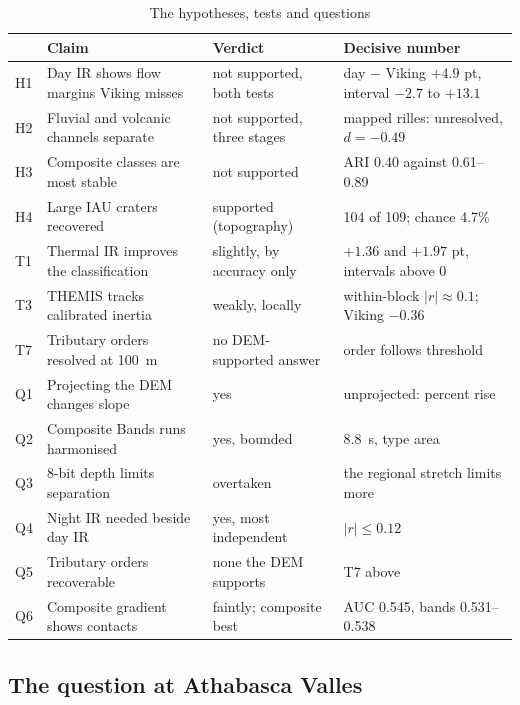 \documentclass[twocolumn]{aastex701}
\begin{document}
\begin{table}[t]
\centering
\caption{The hypotheses, tests and questions \label{tab:hyp}}
\small
\setlength{\tabcolsep}{3.5pt}
\begin{tabular}{llll}
\hline\hline
 & Claim & Verdict & Decisive number \\
\hline
H1 & Day IR shows flow margins Viking misses & not supported, both tests & day $-$ Viking $+4.9$ pt, interval $-2.7$ to $+13.1$ \\
H2 & Fluvial and volcanic channels separate & not supported, three stages & mapped rilles: unresolved, $d=-0.49$ \\
H3 & Composite classes are most stable & not supported & ARI 0.40 against 0.61--0.89 \\
H4 & Large IAU craters recovered & supported (topography) & 104 of 109; chance 4.7\% \\
T1 & Thermal IR improves the classification & slightly, by accuracy only & $+1.36$ and $+1.97$ pt, intervals above 0 \\
T3 & THEMIS tracks calibrated inertia & weakly, locally & within-block $|r|\approx0.1$; Viking $-0.36$ \\
T7 & Tributary orders resolved at 100~m & no DEM-supported answer & order follows threshold \\
\hline
Q1 & Projecting the DEM changes slope & yes & unprojected: percent rise \\
Q2 & Composite Bands runs harmonised & yes, bounded & 8.8~s, type area \\
Q3 & 8-bit depth limits separation & overtaken & the regional stretch limits more \\
Q4 & Night IR needed beside day IR & yes, most independent & $|r|\le0.12$ \\
Q5 & Tributary orders recoverable & none the DEM supports & T7 above \\
Q6 & Composite gradient shows contacts & faintly; composite best & AUC 0.545, bands 0.531--0.538 \\
\hline
\end{tabular}
\end{table}

\subsection{The question at Athabasca Valles} \label{sec:athabasca}
\end{document}
